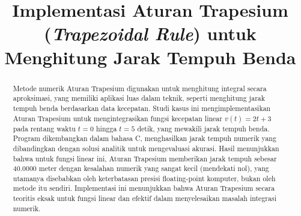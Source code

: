 \documentclass[conference]{IEEEtran}
\begin{document}
\title{Implementasi Aturan Trapesium (\textit{Trapezoidal Rule}) untuk Menghitung Jarak Tempuh Benda}

\author{
\and
{}
\and
{}
\and
{}
}

\maketitle

\begin{abstract}
Metode numerik Aturan Trapesium digunakan untuk menghitung integral secara aproksimasi, yang memiliki aplikasi luas dalam teknik, seperti menghitung jarak tempuh benda berdasarkan data kecepatan. Studi kasus ini mengimplementasikan Aturan Trapesium untuk mengintegrasikan fungsi kecepatan linear \( v(t) = 2t + 3 \) pada rentang waktu \( t = 0 \) hingga \( t = 5 \) detik, yang mewakili jarak tempuh benda. Program dikembangkan dalam bahasa C, menghasilkan jarak tempuh numerik yang dibandingkan dengan solusi analitik untuk mengevaluasi akurasi. Hasil menunjukkan bahwa untuk fungsi linear ini, Aturan Trapesium memberikan jarak tempuh sebesar 40.0000 meter dengan kesalahan numerik yang sangat kecil (mendekati nol), yang utamanya disebabkan oleh keterbatasan presisi floating-point komputer, bukan oleh metode itu sendiri. Implementasi ini menunjukkan bahwa Aturan Trapesium secara teoritis eksak untuk fungsi linear dan efektif dalam menyelesaikan masalah integrasi numerik.
\end{abstract}
\end{document}
